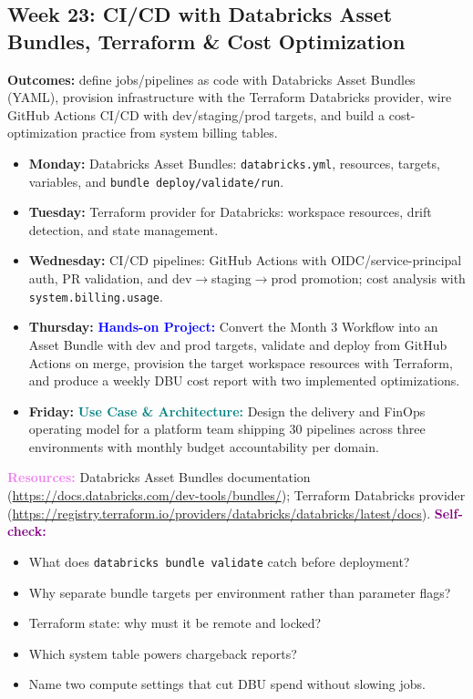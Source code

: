 \documentclass[11pt, a4paper]{article}
\newcommand{\project}[1]{\vspace{1mm}\noindent\textbf{\textcolor{blue}{Hands-on Project:}} #1}
\newcommand{\usecase}[1]{\vspace{1mm}\noindent\textbf{\textcolor{teal}{Use Case \& Architecture:}} #1}
\newcommand{\dayitem}[2]{\item \textbf{#1:} #2}
\newcommand{\resources}[1]{\vspace{1mm}\noindent\textbf{\textcolor{violet}{Resources:}} #1}
\newcommand{\selfcheck}[1]{\vspace{1mm}\noindent\textbf{\textcolor{purple}{Self-check:}} #1}
\begin{document}
\subsection*{Week 23: CI/CD with Databricks Asset Bundles, Terraform \& Cost Optimization}
\par\noindent\textbf{Outcomes:} define jobs/pipelines as code with Databricks Asset Bundles (YAML), provision infrastructure with the Terraform Databricks provider, wire GitHub Actions CI/CD with dev/staging/prod targets, and build a cost-optimization practice from system billing tables.
\begin{itemize}[label=-]
    \dayitem{Monday}{Databricks Asset Bundles: \texttt{databricks.yml}, resources, targets, variables, and \texttt{bundle deploy/validate/run}.}
    \dayitem{Tuesday}{Terraform provider for Databricks: workspace resources, drift detection, and state management.}
    \dayitem{Wednesday}{CI/CD pipelines: GitHub Actions with OIDC/service-principal auth, PR validation, and dev$\rightarrow$staging$\rightarrow$prod promotion; cost analysis with \texttt{system.billing.usage}.}
    \dayitem{Thursday}{\project{Convert the Month 3 Workflow into an Asset Bundle with dev and prod targets, validate and deploy from GitHub Actions on merge, provision the target workspace resources with Terraform, and produce a weekly DBU cost report with two implemented optimizations.}}
    \dayitem{Friday}{\usecase{Design the delivery and FinOps operating model for a platform team shipping 30 pipelines across three environments with monthly budget accountability per domain.}}
\end{itemize}
\resources{Databricks Asset Bundles documentation (\url{https://docs.databricks.com/dev-tools/bundles/}); Terraform Databricks provider (\url{https://registry.terraform.io/providers/databricks/databricks/latest/docs}).}
\selfcheck{\begin{itemize}[label=-, leftmargin=1.5em, itemsep=0pt]
    \item What does \texttt{databricks bundle validate} catch before deployment?
    \item Why separate bundle targets per environment rather than parameter flags?
    \item Terraform state: why must it be remote and locked?
    \item Which system table powers chargeback reports?
    \item Name two compute settings that cut DBU spend without slowing jobs.
\end{itemize}}
\end{document}
